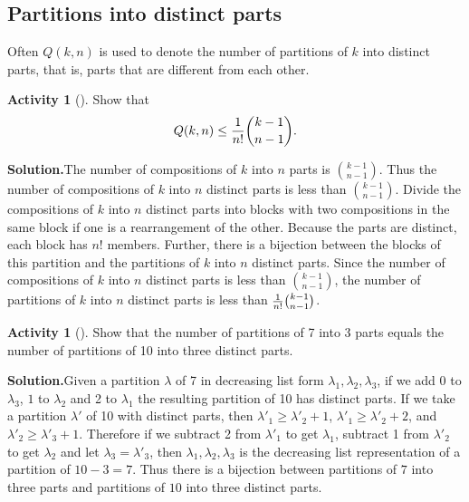 \documentclass[10pt,]{book}
\theoremstyle{plain}
\theoremstyle{definition}
\newtheorem{activity}[project]{Activity}
\numberwithin{equation}{chapter}
\begin{document}
\subsection[{Partitions into distinct parts}]{Partitions into distinct parts}\label{subsection-33}
Often \(Q(k,n)\) is used to denote the number of partitions of \(k\) into distinct parts, that is, parts that are different from each other.%
\begin{activity}[]\label{activity-92}
Show that%
\begin{equation*}
Q(k,n) \le {1\over n!}{k-1\choose n-1}.
\end{equation*}
%
\par\medskip\noindent%
\textbf{Solution.}\quad The number of compositions of \(k\) into \(n\) parts is \(k-1\choose n-1\). Thus the number of compositions of \(k\) into \(n\) distinct parts is less than \(k-1\choose n-1\). Divide the compositions of \(k\) into \(n\) distinct parts into blocks with two compositions in the same block if one is a rearrangement of the other. Because the parts are distinct, each block has \(n!\) members. Further, there is a bijection between the blocks of this partition and the partitions of \(k\) into \(n\) distinct parts. Since the number of compositions of \(k\) into \(n\) distinct parts is less than \(k-1 \choose n-1\), the number of partitions of \(k\) into \(n\) distinct parts is less than \({1\over n!}  {k-1\choose n-1}\).%
\end{activity}
\begin{activity}[]\label{activity-93}
Show that the number of partitions of 7 into 3 parts equals the number of partitions of 10 into three distinct parts.%
\par\medskip\noindent%
\textbf{Solution.}\quad Given a partition \(\lambda\) of 7 in decreasing list form \(\lambda_1,\lambda_2,\lambda_3\), if we add 0 to \(\lambda_3\), \(1\) to \(\lambda_2\) and 2 to \(\lambda_1\) the resulting partition of 10 has distinct parts. If we take a partition \(\lambda'\) of 10 with distinct parts, then \(\lambda'_1\ge\lambda'_2+1\), \(\lambda'_1\ge\lambda'_2+2\), and \(\lambda'_2\ge \lambda'_3+1\). Therefore if we subtract 2 from \(\lambda'_1\) to get \(\lambda_1\), subtract 1 from \(\lambda'_2\) to get \(\lambda_2\) and let \(\lambda_3= \lambda'_3\), then \(\lambda_1,\lambda_2,\lambda_3\) is the decreasing list representation of a partition of \(10-3=7\). Thus there is a bijection between partitions of \(7\) into three parts and partitions of \(10\) into three distinct parts.%
\end{activity}
\end{document}
